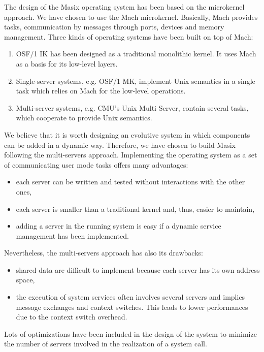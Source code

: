 	The design of the Masix operating system\cite {card:these} has been
based on the microkernel approach. We have chosen to use the Mach microkernel.
Basically, Mach provides tasks, communication by messages through ports,
devices and memory management\cite {osf:kernprinc}.
	Three kinds of operating systems have been built on top of Mach:
\begin {enumerate}
\item OSF/1 IK\cite {osf1} has been designed as a traditional monolithic
kernel. It uses Mach as a basis for its low-level layers.
\item Single-server systems, e.g. OSF/1 MK\cite {osf1mk}, implement Unix
semantics in a single task which relies on Mach for the low-level operations.
\item Multi-server systems, e.g. CMU's Unix Multi
Server\cite {mach:multiserv1}, contain several tasks, which cooperate to
provide Unix semantics.
\end {enumerate}

	We believe that it is worth designing an evolutive system in which
components can
be added in a dynamic way. Therefore, we have chosen to build Masix following
the multi-servers approach.  Implementing the operating
system as a set of communicating user mode tasks offers many advantages:
\begin {itemize}
\item each server can be written and tested without interactions with the
other ones,
\item each server is smaller than a traditional kernel and, thus, easier
to maintain,
\item adding a server in the running system is easy if a dynamic service
management has been implemented.
\end {itemize}

	Nevertheless, the multi-servers approach has also its drawbacks:
\begin {itemize}
\item shared data are difficult to implement because each server has its
own address space,
\item the execution of system services often involves several servers and
implies message exchanges and context switches. This leads to lower
performances due to the context switch overhead.
\end {itemize}

	Lots of optimizations have been included in the design of the system
to minimize the number of servers involved in the realization of a system call.

